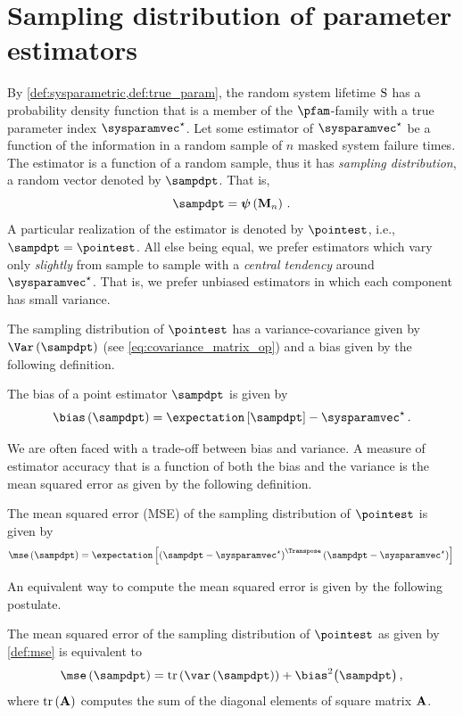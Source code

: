 \documentclass[ ../main.tex]{subfiles}
\begin{document}
\chapter{Sampling distribution of parameter estimators}
\label{sec:general_estimating_parameters:mle}
By \cref{def:sysparametric,def:true_param}, the random system lifetime $\mathrm{S}$ has a probability density function that is a member of the $\pfam$-family with a true parameter index $\tparam\sysparamvec$. Let some estimator of $\tparam\sysparamvec$ be a function of the information in a random sample of $n$ masked system failure times. The estimator is a function of a random sample, thus it has \emph{sampling distribution}, a random vector denoted by $\sampdpt$. That is,
\begin{equation}
\sampdpt = \operatorname{\vec{\psi}}\left(\mfs\right)\,.
\end{equation}
A particular realization of the estimator is denoted by $\pointest$, i.e., $\sampdpt = \pointest$. All else being equal, we prefer estimators which vary only \emph{slightly} from sample to sample with a \emph{central tendency} around $\tparam\sysparamvec$. That is, we prefer unbiased estimators in which each component has small variance.

The sampling distribution of $\pointest$ has a variance-covariance given by $\Var\left(\sampdpt\right)$ (see \cref{eq:covariance_matrix_op}) and a bias given by the following definition.
\begin{definition}
The bias of a point estimator $\sampdpt$ is given by
\begin{equation}
    \bias\left(\sampdpt\right) = \expectation\left[\sampdpt\right] - \tparam\sysparamvec\,.
\end{equation}
\end{definition}
We are often faced with a trade-off between bias and variance. A measure of estimator accuracy that is a function of both the bias and the variance is the mean squared error as given by the following definition.
\begin{definition}
\label{def:mse}
The mean squared error (MSE) of the sampling distribution of $\pointest$ is given by
\begin{equation}
\label{eq:mse}
\mse \left( \sampdpt \right) = \expectation \left [
        \left (
            \sampdpt - \tparam\sysparamvec
        \right )^{\Transpose}
        \left (
            \sampdpt - \tparam\sysparamvec
        \right )
    \right ]\\
\end{equation}
\end{definition}
An equivalent way to compute the mean squared error is given by the following postulate.
\begin{postulate}
The mean squared error of the sampling distribution of $\pointest$ as given by \cref{def:mse} is equivalent to
\begin{equation}
\label{eq:mse_bias_var}
\mse \left( \sampdpt \right) = \trace\left(\var \left ( \sampdpt \right )\right) +
    \bias^2 \bigl(\sampdpt \bigr)\,,
\end{equation}
where $\operatorname{tr}\left(\mathbf{A}\right)$ computes the sum of the diagonal elements of square matrix $\mathbf{A}$.
\end{postulate}
\end{document}
